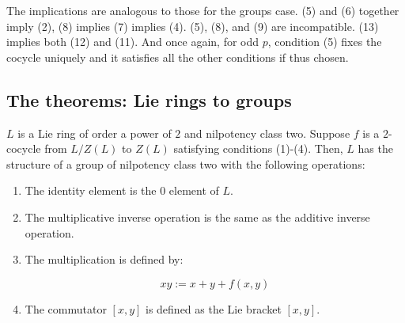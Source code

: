 \documentclass[10pt]{amsart}
\begin{document}
The implications are analogous to those for the groups case. (5) and
(6) together imply (2), (8) implies (7) implies (4). (5), (8), and (9)
are incompatible. (13) implies both (12) and (11). And once again, for
odd $p$, condition (5) fixes the cocycle uniquely and it satisfies all
the other conditions if thus chosen.

\subsection{The theorems: Lie rings to groups}

\begin{theorem}\label{lazardringtogroup1234}
  $L$ is a Lie ring of order a power of $2$ and nilpotency class
  two. Suppose $f$ is a $2$-cocycle from $L/Z(L)$ to $Z(L)$ satisfying
  conditions (1)-(4). Then, $L$ has the structure of a group of
  nilpotency class two with the following operations:

  \begin{enumerate}
  \item The identity element is the $0$ element of $L$.
  \item The multiplicative inverse operation is the same as the
    additive inverse operation.
  \item The multiplication is defined by:

    $$xy := x + y + f(x,y)$$

  \item The commutator $[x,y]$ is defined as the Lie bracket $[x,y]$.
  \end{enumerate}
\end{theorem}
\end{document}
